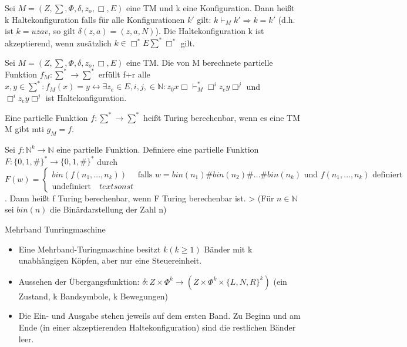 \documentclass[avery5371]{flashcards}
\begin{document}
\begin{flashcard}[Definition]{} Sei $M=(Z,\sum,\Phi,\delta,z_o,\Box,E)$ eine TM und k eine Konfiguration. Dann heißt k Haltekonfiguration falls für alle Konfigurationen $k'$ gilt: $k\vdash_M k'\Rightarrow k=k'$ (d.h. ist $k=uzav$, so gilt $\delta(z,a)=(z,a,N)$). Die Haltekonfiguration k ist akzeptierend, wenn zusätzlich $k\in\Box^*E\sum^*\Box^*$ gilt.
\end{flashcard}

\begin{flashcard}[Definition]{} Sei $M=(Z,\sum,\Phi,\delta,z_o,\Box,E)$ eine TM. Die von M berechnete partielle Funktion $f_M:\sum^*\rightarrow \sum^*$ erfüllt f+r alle $x,y\in\sum^*: f_M(x)=y\leftrightarrow \exists z_e \in E,i,j,\in\mathbb{N}:z_0x\Box \vdash_M^* \Box^i z_e y\Box^j$ und $\Box^iz_ey\Box^j$ ist Haltekonfiguration.
\end{flashcard}

\begin{flashcard}[Definition]{} Eine partielle Funktion $f:\sum^*\rightarrow\sum^*$ heißt Turing berechenbar, wenn es eine TM M gibt mti $g_M=f$.
\end{flashcard}

\begin{flashcard}[Definition]{} Sei $f:\mathbb{N}^k\rightarrow\mathbb{N}$ eine partielle Funktion. Definiere eine partielle Funktion $F:\{0,1,\#\}^*\rightarrow\{0,1,\#\}^*$ durch $F(w)=\begin{cases} bin(f(n_1,\dots ,n_k)) \quad\text{ falls } w=bin(n_1)\#bin(n_2)\#\dots \#bin(n_k) \text{ und } f(n_1,\dots,n_k) \text{ definiert} \\ \text{undefiniert} \quad{text{ sonst }}\end{cases}$. Dann heißt f Turing berechenbar, wenn F Turing berechenbar ist.
> (Für $n\in\mathbb{N}$ sei $bin(n)$ die Binärdarstellung der Zahl n)
\end{flashcard}

\begin{flashcard}[Definition]{Mehrband Tunringmaschine}\begin{itemize}
\item Eine Mehrband-Turingmaschine besitzt $k(k\geq 1)$ Bänder mit k unabhängigen Köpfen, aber nur eine Steuereinheit.
\item Aussehen der Übergangsfunktion: $\delta:Z\times\Phi^k\rightarrow (Z\times\Phi^k\times\{L,N,R\}^k)$ (ein Zustand, k Bandsymbole, k Bewegungen)
\item Die Ein- und Ausgabe stehen jeweils auf dem ersten Band. Zu Beginn und am Ende (in einer akzeptierenden Haltekonfiguration) sind die restlichen Bänder leer.
\end{itemize}
\end{flashcard}
\end{document}
